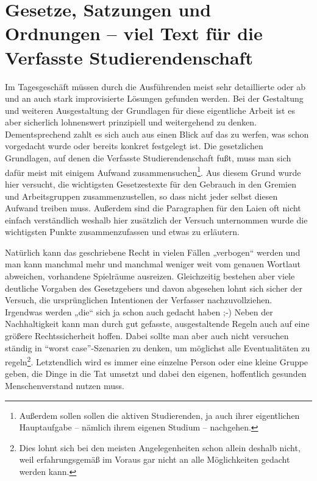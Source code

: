 \documentclass[
10pt,
a4paper,
twoside,								%
titlepage=false,							%
draft=false								%
]{scrartcl}
\begin{document}
\newpage
\vspace*{0.5cm}
\thispagestyle{empty}

\section*{Gesetze, Satzungen und Ordnungen – viel Text für die Verfasste Studierendenschaft}

Im Tagesgeschäft müssen durch die Ausführenden meist sehr detaillierte oder ab und an auch stark improvisierte Lösungen gefunden werden. Bei der Gestaltung und weiteren Ausgestaltung der Grundlagen für diese eigentliche Arbeit ist es aber sicherlich lohnenswert prinzipiell und weitergehend zu denken. Dementsprechend zahlt es sich auch aus einen Blick auf das zu werfen, was schon vorgedacht wurde oder bereits konkret festgelegt ist. Die gesetzlichen Grundlagen, auf denen die Verfasste Studierendenschaft fußt, muss man sich dafür meist mit einigem Aufwand zusammensuchen\footnote{Außerdem sollen sollen die aktiven Studierenden, ja auch ihrer eigentlichen Hauptaufgabe – nämlich ihrem eigenen Studium – nachgehen.}. Aus diesem Grund wurde hier versucht, die wichtigsten Gesetzestexte für den Gebrauch in den Gremien und Arbeitsgruppen zusammenzustellen, so dass nicht jeder selbst diesen Aufwand treiben muss. Außerdem sind die Paragraphen für den Laien oft nicht einfach verständlich weshalb hier zusätzlich der Versuch unternommen wurde die wichtigsten Punkte zusammenzufassen und etwas zu erläutern.

Natürlich kann das geschriebene Recht in vielen Fällen „verbogen“ werden und man kann manchmal mehr und manchmal weniger weit vom genauen Wortlaut abweichen, vorhandene Spielräume ausreizen. Gleichzeitig bestehen aber viele deutliche Vorgaben des Gesetzgebers und davon abgesehen lohnt sich sicher der Versuch, die ursprünglichen Intentionen der Verfasser nachzuvollziehen. Irgendwas werden „die“ sich ja schon auch gedacht haben ;-) Neben der Nachhaltigkeit kann man durch gut gefasste, ausgestaltende Regeln auch auf eine größere Rechtssicherheit hoffen. Dabei sollte man aber auch nicht versuchen ständig in “worst case”-Szenarien zu denken, um möglichst alle Eventualitäten zu regeln\footnote{Dies lohnt sich bei den meisten Angelegenheiten schon allein deshalb nicht, weil erfahrungsgemäß im Voraus gar nicht an alle Möglichkeiten gedacht werden kann.}. Letztendlich wird es immer eine einzelne Person oder eine kleine Gruppe geben, die Dinge in die Tat umsetzt und dabei den eigenen, hoffentlich gesunden Menschenverstand nutzen muss.
\end{document}
